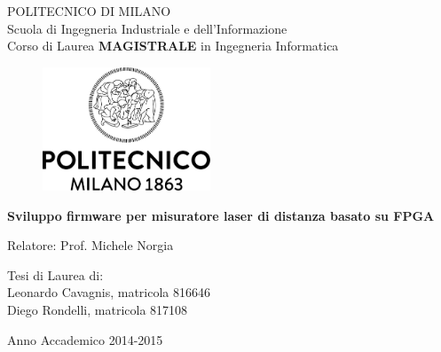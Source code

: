 \thispagestyle{empty}
\vspace*{-1.5cm} \bfseries{
\begin{center}
  \large
  POLITECNICO DI MILANO\\
  \normalsize
  Scuola di Ingegneria Industriale e dell'Informazione\\
  Corso di Laurea \textbf{MAGISTRALE} in Ingegneria Informatica\\
  \begin{figure}[htbp]
    \begin{center}
      \includegraphics[width=5cm]{./pictures/frontesp/NewLogo.png}
    \end{center}
  \end{figure}
  \vspace*{0.3cm} \LARGE



  \textbf{Sviluppo firmware per misuratore laser di distanza basato su FPGA}\\



  \vspace*{.75truecm} \large
\end{center}
\vspace*{3.0cm} \large
\begin{flushleft}


  Relatore: Prof. Michele Norgia

\end{flushleft}
\vspace*{1.0cm}
\begin{flushright}


  Tesi di Laurea di:\\ Leonardo Cavagnis, matricola 816646 \\ 
		       Diego Rondelli, matricola 817108 \\


\end{flushright}
\vspace*{0.5cm}
\begin{center}



  Anno Accademico 2014-2015
\end{center} \clearpage
}
